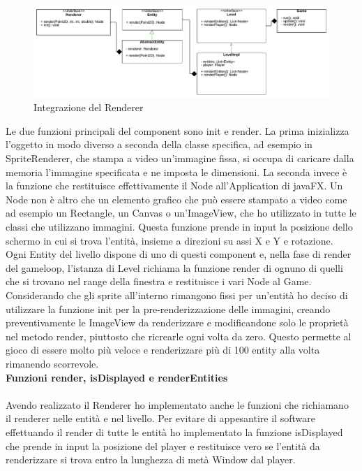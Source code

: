 \documentclass{article}
\begin{document}
\begin{figure}[ht]
\includegraphics[width=1\textwidth]{images/renderer.png}
\caption{Integrazione del Renderer}
\label{fig:renderer}
\end{figure}

Le due funzioni principali del component sono init e render.
La prima inizializza l'oggetto in modo diverso a seconda della classe specifica, ad esempio in SpriteRenderer, che stampa a video un'immagine fissa, si occupa di caricare dalla memoria l'immagine specificata e ne imposta le dimensioni.
La seconda invece è la funzione che restituisce effettivamente il Node all'Application di javaFX. Un Node non è altro che un elemento grafico che può essere stampato a video come ad esempio un Rectangle, un Canvas o un'ImageView, che ho utilizzato in tutte le classi che utilizzano immagini. Questa funzione prende in input la posizione dello schermo in cui si trova l'entità, insieme a direzioni su assi X e Y e rotazione.\\

Ogni Entity del livello dispone di uno di questi component e, nella fase di render del gameloop, l'istanza di Level richiama la funzione render di ognuno di quelli che si trovano nel range della finestra e restituisce i vari Node al Game.\\

Considerando che gli sprite all'interno rimangono fissi per un'entità ho deciso di utilizzare la funzione init per la pre-renderizzazione delle immagini, creando preventivamente le ImageView da renderizzare e modificandone solo le proprietà nel metodo render, piuttosto che ricrearle ogni volta da zero. Questo permette al gioco di essere molto più veloce e renderizzare più di 100 entity alla volta rimanendo scorrevole.\\

\textbf{Funzioni render, isDisplayed e renderEntities}\\
\\
Avendo realizzato il Renderer ho implementato anche le funzioni che richiamano il renderer nelle entità e nel livello.
Per evitare di appesantire il software effettuando il render di tutte le entità ho implementato la funzione isDisplayed che prende in input la posizione del player e restituisce vero se l'entità da renderizzare si trova entro la lunghezza di metà Window dal player.\\
\end{document}
